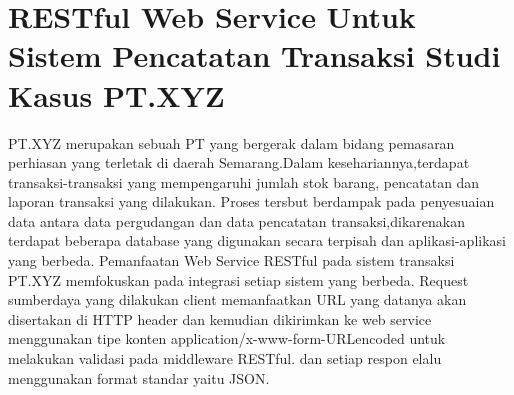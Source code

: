 \section{RESTful Web Service Untuk Sistem Pencatatan Transaksi Studi Kasus PT.XYZ}
PT.XYZ merupakan sebuah PT yang bergerak dalam bidang pemasaran perhiasan yang terletak di daerah Semarang.Dalam kesehariannya,terdapat transaksi-transaksi yang mempengaruhi jumlah stok barang, pencatatan dan laporan transaksi yang dilakukan. Proses tersbut berdampak pada penyesuaian data antara data pergudangan dan data pencatatan transaksi,dikarenakan terdapat beberapa database yang digunakan secara terpisah dan aplikasi-aplikasi yang berbeda.
Pemanfaatan Web Service RESTful pada sistem transaksi PT.XYZ memfokuskan pada integrasi setiap sistem yang berbeda. Request sumberdaya yang dilakukan client memanfaatkan URL yang datanya akan disertakan di HTTP header dan kemudian dikirimkan ke web service menggunakan tipe konten application/x-www-form-URLencoded untuk melakukan validasi pada middleware RESTful. dan setiap respon elalu menggunakan format standar yaitu JSON.
\cite{tanaem2016restful}

